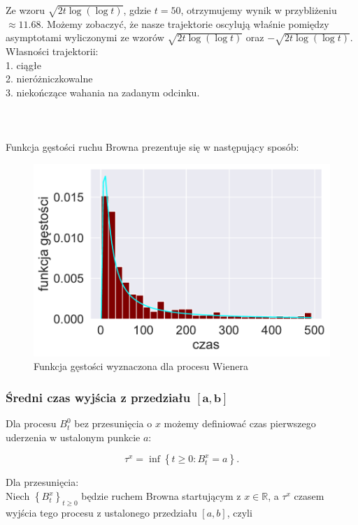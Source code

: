 \documentclass[12pt]{mwart}
\begin{document}
	\noindent Ze wzoru $\sqrt{2t \log(\log t)}$, gdzie $t = 50$, otrzymujemy wynik w przybliżeniu $\approx 11.68$. Możemy zobaczyć, że nasze trajektorie oscylują właśnie pomiędzy asymptotami wyliczonymi ze wzorów $\sqrt{2t\log(\log t)}$ oraz $-\sqrt{2t\log(\log t)}$.\\
	
	\noindent Własności trajektorii:\\
	1. ciągłe\\
	2. nieróżniczkowalne\\
	3. niekończące wahania na zadanym odcinku.\\
	\\ \\ \\
 Funkcja gęstości ruchu Browna prezentuje się w następujący sposób:\\
 \begin{figure}[H]
 	\begin{center}
 		
 		\includegraphics[scale=0.7]{gestosc.pdf}
 		\caption{Funkcja gęstości wyznaczona dla procesu Wienera}
 	\end{center}
 \end{figure}
	
	
	\subsubsection{Średni czas wyjścia z przedziału $\bm{[a,b]}$}
	\noindent Dla procesu $B_{t}^0$ bez przesunięcia o $x$ możemy definiować czas pierwszego uderzenia w ustalonym punkcie $a$:
	
		$$\tau^x=\inf\left\{t\geqslant0:B^x_t=a \right\}.$$
	
	 \noindent Dla przesunięcia:\\
	 Niech $\left\{B^x_t\right\}_{t\geqslant0}$ będzie ruchem Browna startującym z $x\in\mathbb{R}$, a $\tau^x$ czasem wyjścia tego procesu z ustalonego przedziału $[a, b]$, czyli
\end{document}
